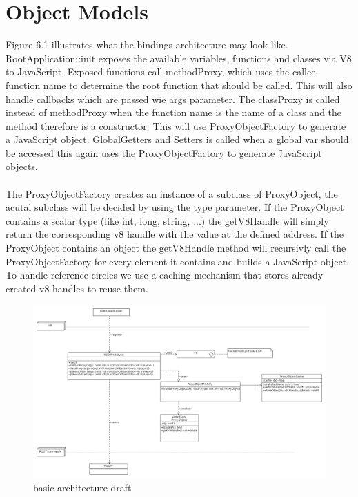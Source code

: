 \section{Object Models}
Figure 6.1 illustrates what the bindings architecture may look like.
RootApplication::init exposes the available variables, functions and classes via V8 to JavaScript.
Exposed functions call methodProxy, which uses the callee function name to determine the root function that should be called. This will also handle callbacks which are passed wie args parameter.
The classProxy is called instead of methodProxy when the function name is the name of a class and the method therefore is a constructor. This will use ProxyObjectFactory to generate a JavaScript object.
GlobalGetters and Setters is called when a global var should be accessed this again uses the ProxyObjectFactory to generate JavaScript objects.
\\\\
The ProxyObjectFactory creates an instance of a subclass of ProxyObject, the acutal subclass will be decided by using the type parameter.
If the ProxyObject contains a scalar type (like int, long, string, ...) the getV8Handle will simply return the corresponding v8 handle with the value at the defined address.
If the ProxyObject contains an object the getV8Handle method will recursivly call the ProxyObjectFactory for every element it contains and builds a JavaScript object.
To handle reference circles we use a caching mechanism that stores already created v8 handles to reuse them.
\begin{figure}[htb]
	\centering
	\includegraphics[width=18cm]{./latex/resources/architecture.png}
	\caption{basic architecture draft}
\end{figure}

\pagebreak[4]

